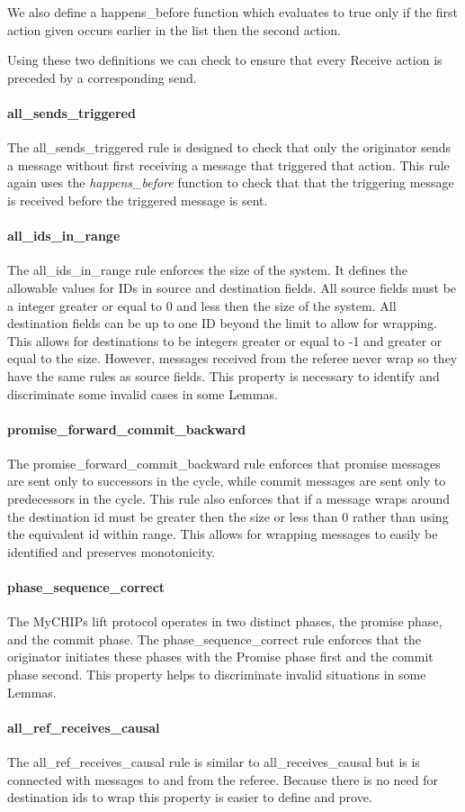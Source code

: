 \documentclass[runningheads]{llncs}
\begin{document}
We also define a happens\_before function which evaluates to true only if the first action given occurs earlier in the list then the second action. 

Using these two definitions we can check to ensure that every Receive action is preceded by a corresponding send. 

\paragraph{all\_sends\_triggered}
The all\_sends\_triggered rule is designed to check that only the originator sends a message without first receiving a message that triggered that action. This rule again uses the \emph{happens\_before} function to check that that the triggering message is received before the triggered message is sent. 

\paragraph{all\_ids\_in\_range}
The all\_ids\_in\_range rule enforces the size of the system. It defines the allowable values for IDs in source and destination fields. All source fields must be a integer greater or equal to 0 and less then the size of the system. All destination fields can be up to one ID beyond the limit to allow for wrapping. This allows for destinations to be integers greater or equal to -1 and greater or equal to the size. However, messages received from the referee never wrap so they have the same rules as source fields. This property is necessary to identify and discriminate some invalid cases in some Lemmas. 

\paragraph{promise\_forward\_commit\_backward}
The promise\_forward\_commit\_backward rule enforces that promise messages are sent only to successors in the cycle, while commit messages are sent only to predecessors in the cycle. This rule also enforces that if a message wraps around the destination id must be greater then the size or less than 0 rather than using the equivalent id within range. This allows for wrapping messages to easily be identified and preserves monotonicity.

\paragraph{phase\_sequence\_correct}
The MyCHIPs lift protocol operates in two distinct phases, the promise phase, and the commit phase. The phase\_sequence\_correct rule enforces that the originator initiates these phases with the Promise phase first and the commit phase second. This property helps to discriminate invalid situations in some Lemmas.

\paragraph{all\_ref\_receives\_causal}
The all\_ref\_receives\_causal rule is similar to all\_receives\_causal but is is connected with messages to and from the referee. Because there is no need for destination ids to wrap this property is easier to define and prove. 
\end{document}
